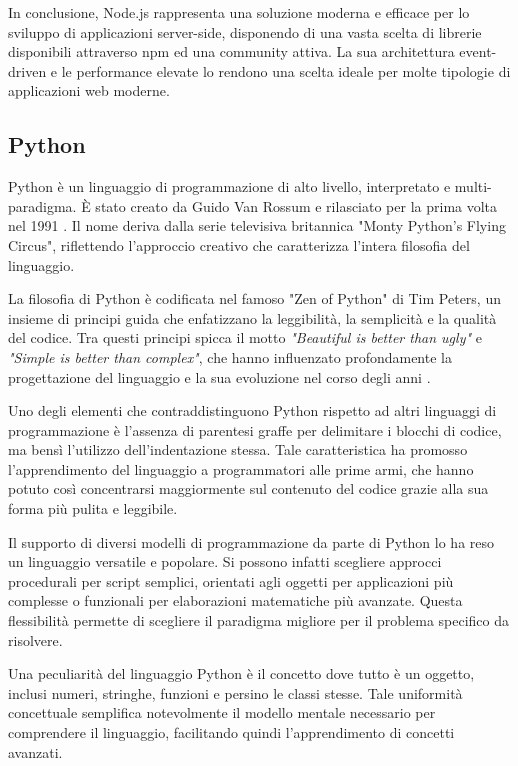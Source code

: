 In conclusione, Node.js rappresenta una soluzione moderna e efficace per lo sviluppo di applicazioni server-side,
disponendo di una vasta scelta di librerie disponibili attraverso \acrfull{npm} ed una community attiva.
La sua architettura event-driven e le performance elevate lo rendono una scelta ideale per molte tipologie
di applicazioni web moderne.

\subsection{Python}

Python è un linguaggio di programmazione di alto livello, interpretato e multi-paradigma.
È stato creato da Guido Van Rossum e rilasciato per la prima volta nel 1991 \citep{van_rossum_1995}.
Il nome deriva dalla serie televisiva britannica "Monty Python's Flying Circus", riflettendo l'approccio creativo
che caratterizza l'intera filosofia del linguaggio.

La filosofia di Python è codificata nel famoso "Zen of Python" di Tim Peters, un insieme di principi guida
che enfatizzano la leggibilità, la semplicità e la qualità del codice. Tra questi principi spicca il motto
\textit{"Beautiful is better than ugly"} e \textit{"Simple is better than complex"}, che hanno influenzato profondamente
la progettazione del linguaggio e la sua evoluzione nel corso degli anni \citep{peters_2004}.

Uno degli elementi che contraddistinguono Python rispetto ad altri linguaggi di programmazione è l'assenza di parentesi
graffe per delimitare i blocchi di codice, ma bensì l'utilizzo dell'indentazione stessa. Tale caratteristica ha promosso
l'apprendimento del linguaggio a programmatori alle prime armi, che hanno potuto così concentrarsi maggiormente sul
contenuto del codice grazie alla sua forma più pulita e leggibile.

Il supporto di diversi modelli di programmazione da parte di Python lo ha reso un linguaggio versatile e popolare.
Si possono infatti scegliere approcci procedurali per script semplici, orientati agli oggetti per applicazioni più
complesse o funzionali per elaborazioni matematiche più avanzate. Questa flessibilità permette di scegliere il paradigma
migliore per il problema specifico da risolvere.

Una peculiarità del linguaggio Python è il concetto dove tutto è un oggetto, inclusi numeri, stringhe,
funzioni e persino le classi stesse. Tale uniformità concettuale semplifica notevolmente il modello mentale necessario
per comprendere il linguaggio, facilitando quindi l'apprendimento di concetti avanzati.

